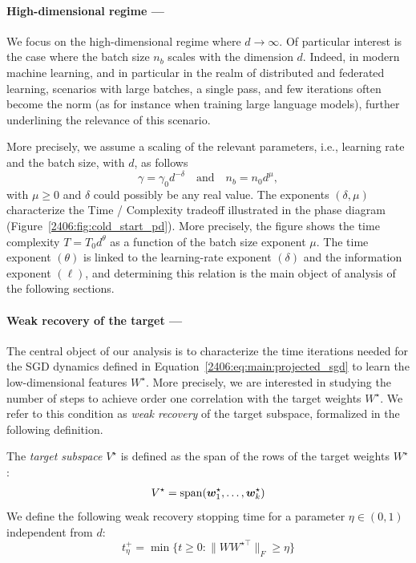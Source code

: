\paragraph{High-dimensional regime ---} We focus on the high-dimensional regime where $d\to\infty$. Of particular interest is the case where the batch size $n_b$ scales with the dimension $d$. Indeed, in modern machine learning, and in particular in the realm of distributed and federated learning, scenarios with large batches, a single pass, and few iterations often become the norm \citep{goyal2017accurate,li2020review} (as for instance when training large language models), further underlining the relevance of this scenario.

More precisely, we assume a scaling of the relevant parameters, i.e., learning rate and the batch size, with \(d\), as follows
\begin{equation}\label{2406:eq:main:gamma_nb_scalings}
\gamma = \gamma_0 d^{-\delta} \quad\text{and}\quad n_b = n_0 d^\mu,
\end{equation}
with \(\mu \ge 0\) and \(\delta\) could possibly be any real value. The exponents $(\delta, \mu)$ characterize the Time / Complexity tradeoff illustrated in the phase diagram (Figure~\ref{2406:fig:cold_start_pd}). More precisely, the figure shows the time complexity $T = T_0 d^{\theta}$ as a function of the batch size exponent $\mu$. The time exponent $(\theta)$ is linked to the learning-rate exponent $(\delta)$ and the information exponent $(\ell)$, and determining this relation is the main object of analysis of the following sections.  

\paragraph{Weak recovery of the target ---} The central object of our analysis is to characterize the time iterations needed for the SGD dynamics defined in Equation~\eqref{2406:eq:main:projected_sgd} to learn the low-dimensional features $W^\star$. More precisely, we are interested in studying the number of steps to achieve order one correlation with the target weights $W^\star$. We refer to this condition as \textit{weak recovery} of the target subspace, formalized in the following definition.
\begin{definition}
\label{2406:def:weak_recovery}
    The \textit{target subspace} $V^\star$ is defined as the span of the rows of the target weights $W^\star$:
    \begin{align}
    \label{2406:eq:main:teacher_subspace_def}
        V^\star = {\rm span}(\vec w^\star_1, \dots, \vec w^\star_k)
    \end{align}
    We define the following weak recovery stopping time for a parameter $\eta \in (0,1)$ independent from $d$:
\begin{equation}
    t^{+}_{\eta} = \min\{t \geq 0: \lVert W W^{\star \top} \rVert_F \geq \eta\}
\end{equation}
\end{definition}


